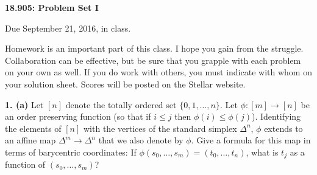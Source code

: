 \documentclass[12pt]{article}
\begin{document}
\thispagestyle{empty}

\def\da#1{\downarrow\rlap{$\vcenter{\hbox{$\scriptstyle#1$}}$}}
\def\ua#1{\uparrow\rlap{$\vcenter{\hbox{$\scriptstyle#1$}}$}}

\def\coker{\mathrm{coker}\,}
\def\im{\mathrm{im}\,}
\def\ker{\mathrm{ker}\,}
\def\NN{\mathbb N}
\def\ZZ{\mathbb Z}
\def\RR{\mathbf R}
\def\Ext{\mathrm{Ext}}
\def\Tor{\mathrm{Tor}}
\def\Hom{\mathrm{Hom}}
\def\Der{\mathrm{Der}}
\def\Map{\mathrm{Map}}
\def\Gp{\mathbf{Gp}}
\def\Mon{\mathbf{Mon}}
\def\mod{\hbox{mod}}
\def\be{\begin{equation}}
\def\ee{\end{equation}}
\def\tensor{\otimes}
\def\iso{\cong}
\def\Ho{\mathrm{Ho}\,}
\def\rin{\mathrm{in}}
\def\la#1{\mathop{\longleftarrow}\limits^{#1}}
\def\ra#1{\mathop{\longrightarrow}\limits^{#1}}
\def\bS{\mathbf{S}}

\def\inj{\mathrm{in}}
\def\pr{\mathrm{pr}}
\def\div{\mathrm{div}}
\def\grad{\mathrm{grad}}
\def\curl{\mathrm{curl}}
\def\Sin{\mathrm{Sin}}

\def\SF{\mathcal{C}^\infty}
\def\VF{\mathcal{VF}^\infty}


\def\TT{\mathbb{T}}
\def\Tensor{\bigotimes}
\def\bDelta{\mathbf{\Delta}}
\def\bSet{\mathbf{Set}}
\def\bAb{\mathbf{Ab}}
\def\bTop{\mathbf{Top}}
\def\bC{\mathbf{C}}




\begin{center}
{\bf 18.905: Problem Set I}
\end{center}

Due September 21, 2016, in class. 

Homework is an important part of this class. I hope you gain from the
struggle. Collaboration can be effective, but be sure that you
grapple with each problem on your own as well. If you do work with others,
you must indicate with whom on your solution sheet. Scores will be posted
on the Stellar website.

\bigskip

{\bf 1. (a)} Let $[n]$ denote the totally ordered set $\{0,1,\ldots,n\}$. 
Let $\phi:[m]\rightarrow[n]$ be an order preserving function
(so that if $i\leq j$ then $\phi(i)\leq\phi(j)$). Identifying the elements of
$[n]$ with the vertices of the standard simplex $\Delta^n$, $\phi$ extends to
an affine map $\Delta^m\rightarrow\Delta^n$ that we also denote by $\phi$.
Give a formula for
this map in terms of barycentric coordinates: If 
$\phi(s_0,\ldots,s_m)=(t_0,\ldots,t_n)$, what is $t_j$ as a function
of $(s_0,\ldots,s_m)$?
\end{document}
